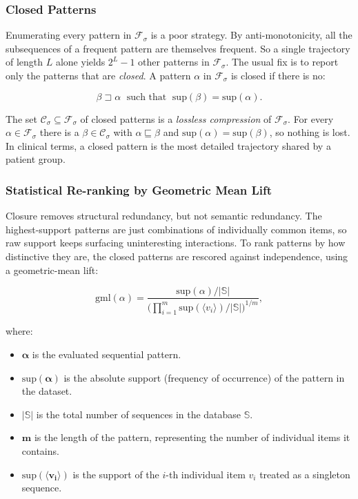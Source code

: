 \subsubsection*{Closed Patterns}

Enumerating every pattern in $\mathcal{F}_\sigma$ is a poor strategy. By anti-monotonicity, all the subsequences of a frequent pattern are themselves frequent. So a single trajectory of length $L$ alone yields $2^L-1$ other patterns in $\mathcal{F}_\sigma$. The usual fix is to report only the patterns that are \emph{closed}. A pattern $\alpha$ in $\mathcal{F}_\sigma$ is closed if there is no:

\begin{equation}
    \beta \sqsupset \alpha \;\text{ such that }\; \mathrm{sup}(\beta) = \mathrm{sup}(\alpha).
    \label{eq:closed}
\end{equation}

The set $\mathcal{C}_\sigma \subseteq \mathcal{F}_\sigma$ of closed patterns is a \emph{lossless compression} of $\mathcal{F}_\sigma$. For every $\alpha \in \mathcal{F}_\sigma$ there is a $\beta \in \mathcal{C}_\sigma$ with $\alpha \sqsubseteq \beta$ and $\mathrm{sup}(\alpha) = \mathrm{sup}(\beta)$, so nothing is lost. In clinical terms, a closed pattern is the most detailed trajectory shared by a patient group.

\subsubsection*{Statistical Re-ranking by Geometric Mean Lift}

Closure removes structural redundancy, but not semantic redundancy. The highest-support patterns are just combinations of individually common items, so raw support keeps surfacing uninteresting interactions. To rank patterns by how distinctive they are, the closed patterns are rescored against independence, using a geometric-mean lift:

\begin{equation}
    \mathrm{gml}(\alpha) = \frac{\mathrm{sup}(\alpha)/|\mathbb{S}|}{\bigl(\prod_{i=1}^{m} \mathrm{sup}(\langle v_i \rangle)/|\mathbb{S}|\bigr)^{1/m}},
    \label{eq:gml}
\end{equation}

where:
\begin{itemize}
    \item $\boldsymbol{\alpha}$ is the evaluated sequential pattern.
    \item $\boldsymbol{\mathrm{sup}(\alpha)}$ is the absolute support (frequency of occurrence) of the pattern in the dataset.
    \item $\boldsymbol{|\mathbb{S}|}$ is the total number of sequences in the database $\mathbb{S}$.
    \item $\boldsymbol{m}$ is the length of the pattern, representing the number of individual items it contains.
    \item $\boldsymbol{\mathrm{sup}(\langle v_i \rangle)}$ is the support of the $i$-th individual item $v_i$ treated as a singleton sequence.
\end{itemize}

